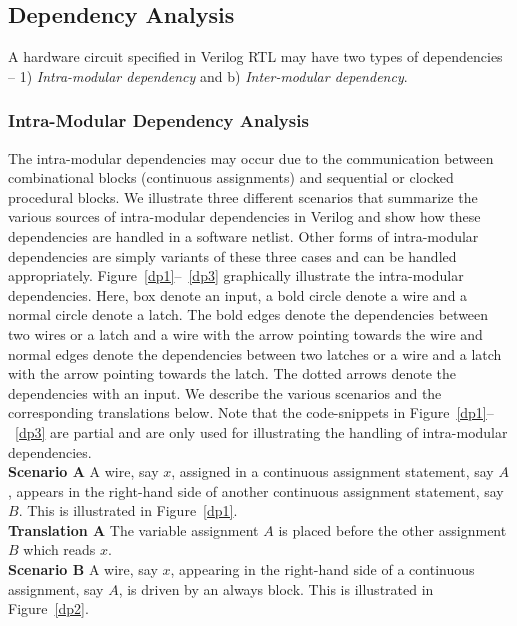 \subsection{Dependency Analysis}
%
A hardware circuit specified in Verilog RTL may have two types of dependencies -- 
1) \emph{Intra-modular dependency} and b) \emph{Inter-modular dependency}. 
%
\subsubsection{Intra-Modular Dependency Analysis}
%
The intra-modular dependencies may occur due to the communication between
combinational blocks (continuous assignments) and sequential or clocked 
procedural blocks.  We illustrate three different scenarios that summarize 
the various sources of intra-modular dependencies in Verilog and show 
how these dependencies are handled in a software netlist.  Other forms of 
intra-modular dependencies are simply variants of these three cases 
and can be handled appropriately.
%
Figure~\ref{dp1}--~\ref{dp3} graphically illustrate the intra-modular dependencies.  
%
Here, box denote an input, a bold circle denote a wire and a normal circle
denote a latch.  The bold edges denote the dependencies between two wires or a latch 
and a wire with the arrow pointing towards the wire and normal edges denote the 
dependencies between two latches or a wire and a latch with the arrow pointing
towards the latch. The dotted arrows denote the dependencies with an input. 
%
We describe the various scenarios and the corresponding translations below. 
Note that the code-snippets in Figure~\ref{dp1}--~\ref{dp3} are partial 
and are only used for illustrating the handling of intra-modular dependencies.
\\
%
\noindent \textbf{Scenario A}  A wire, say $x$,  assigned in a continuous assignment 
statement, say $A$, appears in the right-hand side of another continuous assignment 
statement, say $B$.  This is illustrated in Figure~\ref{dp1}.\\

\noindent \textbf{Translation A} The variable assignment $A$ is placed before the other assignment $B$ 
which reads $x$.  \\

\noindent \textbf{Scenario B} A wire, say $x$, appearing in the right-hand side of a 
continuous assignment, say $A$, is driven by an always block.  This is illustrated in 
Figure~\ref{dp2}.\\

